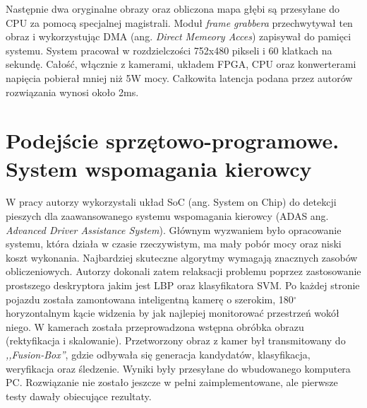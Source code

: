Następnie dwa oryginalne obrazy oraz obliczona mapa głębi są przesyłane do CPU za pomocą specjalnej magistrali.
Moduł \textit{frame grabbera} przechwytywał ten obraz i wykorzystując DMA (ang. \textit{Direct Memeory Acces}) zapisywał do pamięci systemu.
System pracował w rozdzielczości 752x480 pikseli i 60 klatkach na sekundę. 
Całość, włącznie z kamerami, układem FPGA, CPU oraz konwerterami napięcia pobierał mniej niż 5W mocy. 
Całkowita latencja podana przez autorów rozwiązania wynosi około 2ms.


\section{Podejście sprzętowo-programowe. System wspomagania kierowcy}
W pracy \cite{piao2016real} autorzy wykorzystali układ SoC (ang. System on Chip) do detekcji pieszych dla zaawansowanego systemu wspomagania kierowcy (ADAS ang. \textit{Advanced Driver Assistance System}). 
Głównym wyzwaniem było opracowanie systemu, która działa w czasie rzeczywistym, ma mały pobór mocy oraz niski koszt wykonania. 
Najbardziej skuteczne algorytmy wymagają znacznych zasobów obliczeniowych. %
Autorzy dokonali zatem relaksacji problemu poprzez zastosowanie prostszego deskryptora jakim jest LBP oraz klasyfikatora SVM. 
Po każdej stronie pojazdu została zamontowana inteligentną kamerę o szerokim, 180$^\circ$ horyzontalnym kącie widzenia by jak najlepiej monitorować przestrzeń wokół niego. 
W kamerach została przeprowadzona wstępna obróbka obrazu (rektyfikacja i skalowanie). 
Przetworzony obraz z kamer był transmitowany do \textit{,,Fusion-Box''}, gdzie odbywała się generacja kandydatów, klasyfikacja, weryfikacja oraz śledzenie. 
Wyniki były przesyłane do wbudowanego komputera PC. 
Rozwiązanie nie zostało jeszcze w pełni zaimplementowane, ale pierwsze testy dawały obiecujące rezultaty.

